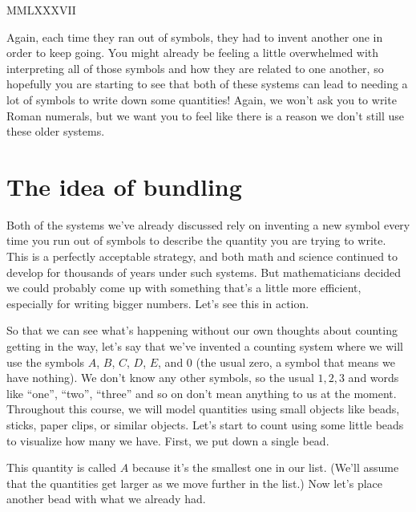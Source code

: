 \documentclass{ximera}
\begin{document}
\begin{image}
MMLXXXVII
\end{image}

Again, each time they ran out of symbols, they had to invent another one in order to keep going. You might already be feeling a little overwhelmed with interpreting all of those symbols and how they are related to one another, so hopefully you are starting to see that both of these systems can lead to needing a lot of symbols to write down some quantities! Again, we won't ask you to write Roman numerals, but we want you to feel like there is a reason we don't still use these older systems.

\section{The idea of bundling}

Both of the systems we've already discussed rely on inventing a new symbol every time you run out of symbols to describe the quantity you are trying to write. This is a perfectly acceptable strategy, and both math and science continued to develop for thousands of years under such systems. But mathematicians decided we could probably come up with something that's a little more efficient, especially for writing bigger numbers. Let's see this in action.

So that we can see what's happening without our own thoughts about counting getting in the way, let's say that we've invented a counting system where we will use the symbols $A$, $B$, $C$, $D$, $E$, and $0$ (the usual zero, a symbol that means we have nothing). We don't know any other symbols, so the usual $1, 2, 3$ and words like ``one'', ``two'', ``three'' and so on don't mean anything to us at the moment. Throughout this course, we will model quantities using small objects like beads, sticks, paper clips, or similar objects. Let's start to count using some little beads to visualize how many we have. First, we put down a single bead.

\begin{image}
\end{image}
This quantity is called $A$ because it's the smallest one in our list. (We'll assume that the quantities get larger as we move further in the list.) Now let's place another bead with what we already had.
\end{document}
